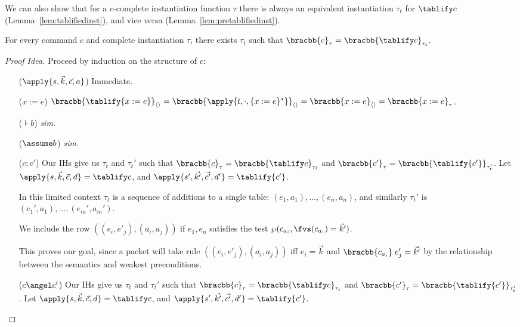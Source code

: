 We can also show that for a $c$-complete instantiation function $\tau$
there is always an equivalent instantiation $\tau_t$ for $\tablify c$
(Lemma~\ref{lem:tablifiedinst}), and vice versa
(Lemma~\ref{lem:pretablifiedinst}).

\begin{lemma}
  \label{lem:tablifiedinst}
  For every command $c$ and complete instantiation $\tau$, there
  exists $\tau_t$ such that
  $\bracbb{c}_\tau = \bracbb{\tablify c}_{\tau_t}$.
\end{lemma}

\begin{proof}[Proof Idea]
  Proceed by induction on the structure of $c$:
  \begin{enumerate}[align=left]
  \item[($\apply{s, \vec k, \vec c, a}$)] Immediate.
  \item[($x := e$)] $\bracbb{\tablify {x := e}}_{\langle \rangle} = \bracbb{\apply{t,\cdot, \{x := e\}^*}}_{\langle \rangle} = \bracbb{x:=e}_{\langle \rangle} = \bracbb{x:=e}_{\tau}$.
  \item[($\assert b$)] \textit{sim.}
  \item[($\assume b$)] \textit{sim.}
  \item[($c;c'$)] Our IHs give us $\tau_t$ and $\tau_t'$ such that
    $\bracbb{c}_\tau = \bracbb{\tablify c }_{\tau_t}$ and
    $\bracbb{c'}_\tau = \bracbb{\tablify {c'}}_{\tau_t'}$. Let
    $\apply{s, \vec k, \vec c, d} = \tablify c$, and
    $\apply{s', \vec{k'}, \vec{c'}, d'} = \tablify {c'}$.

    In this limited context $\tau_t$ is a sequence of additions to a
single table: $(e_1,a_1), \ldots, (e_n, a_n)$, and similarly $\tau_t'$
is $(e_1', a_1), \ldots, (e_m', a_m')$.

    We include the row $((e_i,e'_j), (a_i,a_j))$ if $e_1, e_n$
    satisfies the test $\wp(c_{a_i}, \fvs(c_{a_i}) = \vec k')$.

    This proves our goal, since a packet will take rule
    $((e_i,e'_j), (a_i,a_j))$ iff $e_i = \vec{k}$ and
    $\bracbb{c_{a_i}}\; e_j' = \vec{k'}$ by the relationship between
    the semantics and weakest preconditions.
    
  \item[($c \angel c'$)] Our IHs give us $\tau_t$ and $\tau_t'$ such
    that $\bracbb{c}_\tau = \bracbb{\tablify c }_{\tau_t}$ and
    $\bracbb{c'}_\tau = \bracbb{\tablify {c'}}_{\tau_t'}$. Let
    $\apply{s, \vec k, \vec c, d} = \tablify c$, and
    $\apply{s', \vec{k'}, \vec{c'}, d'} = \tablify {c'}$.


\end{enumerate}
\end{proof}
